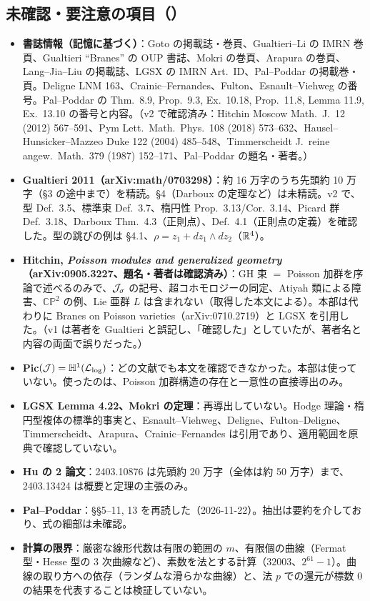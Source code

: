\subsection{未確認・要注意の項目（\tQ）}
\begin{itemize}
\item \textbf{書誌情報（記憶に基づく）}：Goto の掲載誌・巻頁、Gualtieri--Li の IMRN 巻頁、Gualtieri ``Branes'' の OUP 書誌、Mokri の巻頁、Arapura の巻頁、Lang--Jia--Liu の掲載誌、LGSX の IMRN Art.\ ID、Pal--Poddar の掲載巻・頁。Deligne LNM 163、Crainic--Fernandes、Fulton、Esnault--Viehweg の番号。Pal--Poddar の Thm.\ 8.9, Prop.\ 9.3, Ex.\ 10.18, Prop.\ 11.8, Lemma 11.9, Ex.\ 13.10 の番号と内容。（v2 で確認済み：Hitchin Moscow Math.\ J.\ 12 (2012) 567--591、Pym Lett.\ Math.\ Phys.\ 108 (2018) 573--632、Hausel--Hunsicker--Mazzeo Duke 122 (2004) 485--548、Timmerscheidt J.\ reine angew.\ Math.\ 379 (1987) 152--171、Pal--Poddar の題名・著者。）
\item \textbf{Gualtieri 2011（arXiv:math/0703298）}：約 16 万字のうち先頭約 10 万字（\S3 の途中まで）を精読。\S4（Darboux の定理など）は未精読。v2 で、型 Def.\ 3.5、標準束 Def.\ 3.7、楕円性 Prop.\ 3.13/Cor.\ 3.14、Picard 群 Def.\ 3.18、Darboux Thm.\ 4.3（正則点）、Def.\ 4.1（正則点の定義）を確認した。型の跳びの例は \S4.1、$\rho=z_1+dz_1\wedge dz_2$（$\mathbb R^4$）。
\item \textbf{Hitchin, \emph{Poisson modules and generalized geometry}（arXiv:0905.3227、題名・著者は確認済み）}：GH 束 $=$ Poisson 加群を序論で述べるのみで、$\mathcal J_\sigma$ の記号、超コホモロジーの同定、Atiyah 類による障害、$\mathbb{CP}^2$ の例、Lie 亜群 $L$ は含まれない（取得した本文による）。本部は代わりに Branes on Poisson varieties（arXiv:0710.2719）と LGSX を引用した。（v1 は著者を Gualtieri と誤記し、「確認した」としていたが、著者名と内容の両面で誤りだった。）
\item \textbf{Pic$(\mathcal J)=\mathbb H^1(\mathcal L_{\log})$}：どの文献でも本文を確認できなかった。本部は使っていない。使ったのは、Poisson 加群構造の存在と一意性の直接導出のみ。
\item \textbf{LGSX Lemma 4.22、Mokri の定理}：再導出していない。Hodge 理論・楕円型複体の標準的事実と、Esnault--Viehweg、Deligne、Fulton--Deligne、Timmerscheidt、Arapura、Crainic--Fernandes は引用であり、適用範囲を原典で確認していない。
\item \textbf{Hu の 2 論文}：2403.10876 は先頭約 20 万字（全体は約 50 万字）まで、2403.13424 は概要と定理の主張のみ。
\item \textbf{Pal--Poddar}：\S\S5--11, 13 を再読した（2026-11-22）。抽出は要約を介しており、式の細部は未確認。
\item \textbf{計算の限界}：厳密な線形代数は有限の範囲の $m$、有限個の曲線（Fermat 型・Hesse 型の 3 次曲線など）、素数を法とする計算（$32003$、$2^{61}-1$）。曲線の取り方への依存（ランダムな滑らかな曲線）と、法 $p$ での還元が標数 0 の結果を代表することは検証していない。
\end{itemize}

